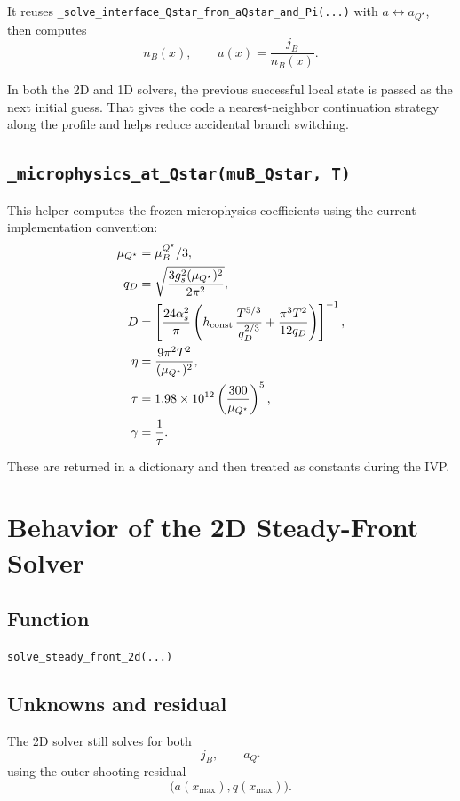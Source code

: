 \documentclass[11pt]{article}
\begin{document}
It reuses
\texttt{\_solve\_interface\_Qstar\_from\_aQstar\_and\_Pi(...)} with
$a \leftrightarrow a_{Q^\star}$, then computes
\begin{equation}
n_B(x), \qquad u(x) = \frac{j_B}{n_B(x)}.
\end{equation}

In both the 2D and 1D solvers, the previous successful local state is passed as
the next initial guess. That gives the code a nearest-neighbor continuation
strategy along the profile and helps reduce accidental branch switching.

\subsection{\texttt{\_microphysics\_at\_Qstar(muB\_Qstar, T)}}
This helper computes the frozen microphysics coefficients using the current
implementation convention:
\begin{align}
\mu_{Q^\star} &= \mu_B^{Q^\star}/3, \\
q_D &= \sqrt{\frac{3 g_s^2 (\mu_{Q^\star})^2}{2\pi^2}}, \\
D &= \left[\frac{24 \alpha_s^2}{\pi}
\left(
h_{\rm const}\,\frac{T^{5/3}}{q_D^{2/3}}
+ \frac{\pi^3 T^2}{12 q_D}
\right)\right]^{-1}, \\
\eta &= \frac{9\pi^2 T^2}{(\mu_{Q^\star})^2}, \\
\tau &= 1.98\times 10^{12}\left(\frac{300}{\mu_{Q^\star}}\right)^5, \\
\gamma &= \frac{1}{\tau}.
\end{align}

These are returned in a dictionary and then treated as constants during the IVP.

\section{Behavior of the 2D Steady-Front Solver}
\subsection{Function}
\texttt{solve\_steady\_front\_2d(...)}

\subsection{Unknowns and residual}
The 2D solver still solves for both
\[
j_B, \qquad a_{Q^\star}
\]
using the outer shooting residual
\[
\bigl(a(x_{\max}), q(x_{\max})\bigr).
\]
\end{document}

